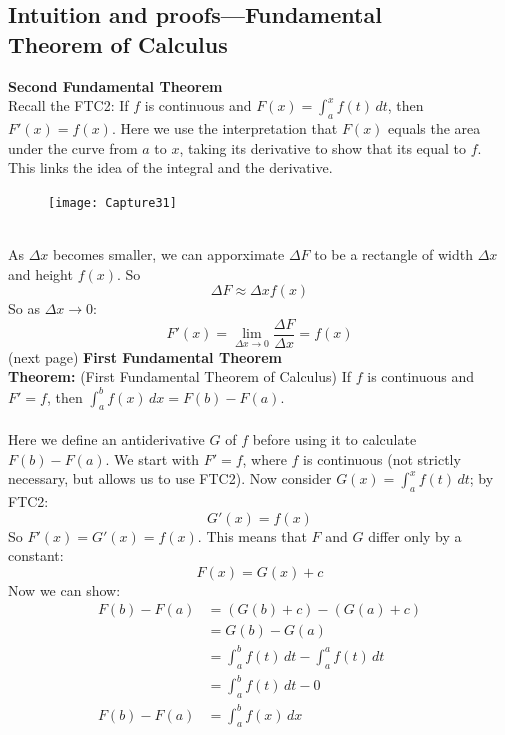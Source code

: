 \documentclass{report}
\begin{document}
\subsection{Intuition and proofs---Fundamental\\Theorem of Calculus} %
\label{fundamentals:integrals:FTC_proof}
\textbf{Second Fundamental Theorem}\\
Recall the FTC2: If $f$ is continuous and 
$F(x)=\int_{a}^xf(t)\,dt$, then $F'(x)=f(x)$. Here we use the interpretation 
that $F(x)$ equals the area under the curve from $a$ to $x$, taking its derivative 
to show that its equal to $f$. This links the idea of the integral and the derivative.
\begin{figure}[h]
\texttt{[image: Capture31]}\\
\centering
{}
\end{figure}\\
As $\Delta x$ becomes smaller, we can apporximate $\Delta F$ to be a rectangle of 
width $\Delta x$ and height $f(x)$. So
\begin{equation*}
\Delta F\approx \Delta xf(x)
\end{equation*}
So as $\Delta x\to0$:
\begin{equation*}
F'(x)=\lim_{\Delta x\to0}\frac{\Delta F}{\Delta x}=f(x)
\end{equation*}
(next page)
\newpage
\noindent\textbf{First Fundamental Theorem}\\
\textbf{Theorem:} (First Fundamental Theorem of Calculus) If $f$ is continuous and
$F'=f$, then $\int_a^bf(x)\,dx=F(b)-F(a)$.\\
\vspace{1mm}\\
Here we define an antiderivative $G$ of $f$ before using it to calculate
$F(b)-F(a)$. We start with $F'=f$, where $f$ is continuous (not strictly necessary, but 
allows us to use FTC2). Now consider $G(x)=\int_a^xf(t)\,dt$; by FTC2:
\begin{equation*}
G'(x)=f(x)
\end{equation*}
So $F'(x)=G'(x)=f(x)$. This means that $F$ and $G$ differ only by a constant:
\begin{equation*}
F(x)=G(x)+c
\end{equation*} 
Now we can show:
\begin{align*}
F(b)-F(a)&=(G(b)+c)-(G(a)+c)\\
&=G(b)-G(a)\\
&=\int_a^bf(t)\,dt-\int_a^af(t)\,dt\\
&=\int_a^bf(t)\,dt-0\\
F(b)-F(a)&=\int_a^bf(x)\,dx
\end{align*}
\newpage
\end{document}
